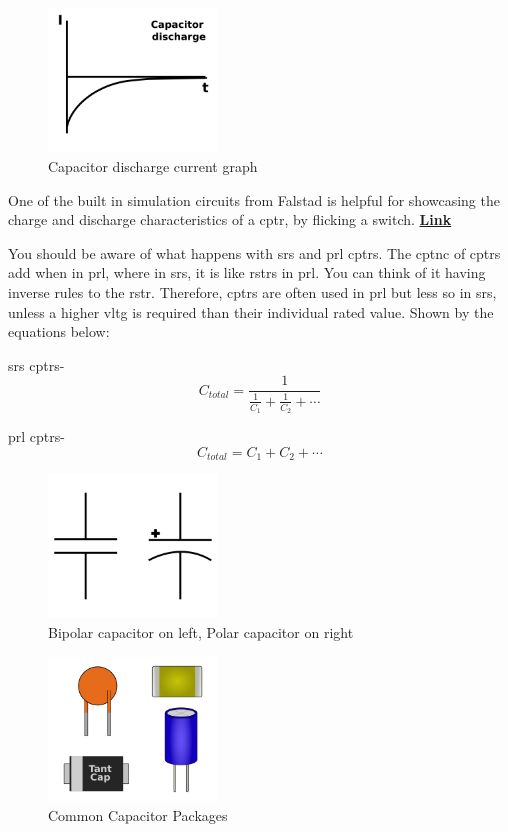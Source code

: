 \documentclass[a4paper,11pt]{report}
\let\oldhref\href %
\renewcommand{\href}[2]{\oldhref{#1}{\bfseries#2}}
\begin{document}
\begin{figure}[H]
\centering
\includegraphics[width=0.4\textwidth]{capacitordischargecurrent}
\caption{Capacitor discharge current graph}
\end{figure}

One of the built in simulation circuits from Falstad is helpful for showcasing the charge and discharge characteristics of a \gls{cptr}, by flicking a switch. \href{https://tinyurl.com/2erbz4jy}{Link}

You should be aware of what happens with \gls{srs} and \gls{prl} \gls{cptr}s. The \gls{cptnc} of \gls{cptr}s add when in \gls{prl}, where in \gls{srs}, it is like \gls{rstr}s in \gls{prl}. You can think of it having inverse rules to the \gls{rstr}. Therefore, \gls{cptr}s are often used in \gls{prl} but less so in \gls{srs}, unless a higher \gls{vltg} is required than their individual rated value. Shown by the equations below:

\gls{srs} \gls{cptr}s- \[C_{total} = \frac{1}{\frac{1}{C_1}+\frac{1}{C_2}+\cdots}\]

\gls{prl} \gls{cptr}s- \[C_{total} = C_1+C_2+\cdots\]

\begin{figure}[H]
\centering
\includegraphics[width=0.4\textwidth]{capacitor1}
\caption{Bipolar capacitor on left, Polar capacitor on right}
\end{figure}

\begin{figure}[H]
\centering
\includegraphics[width=0.4\textwidth]{CapacitorPackages}
\caption{Common Capacitor Packages}
\end{figure}
\end{document}
